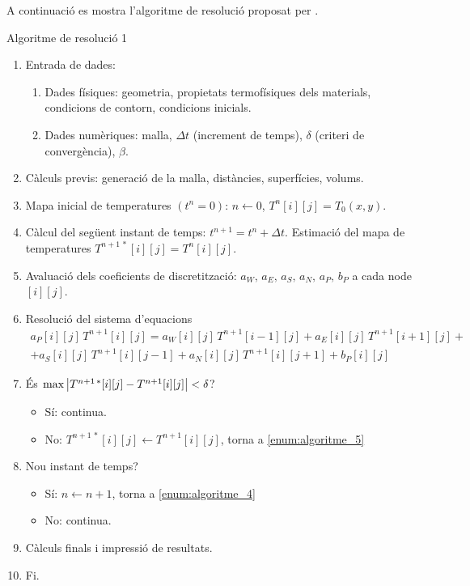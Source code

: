A continuació es mostra l'algoritme de resolució proposat per \cite{cttc}.
\begin{algorithm}[h]
	\caption{Algoritme de resolució 1}
	\label{algorithm:algoritme_resolucio_1}
	\begin{algorithmic}[0]
		\State 
		\begin{enumerate}[label=\textbf{\arabic*}]
			\item Entrada de dades:
			\begin{enumerate}[label=\textbf{1.\arabic*}]
				\item Dades físiques: geometria, propietats termofísiques dels materials, condicions de contorn, condicions inicials.
				\item Dades numèriques: malla, $\Delta t$ (increment de temps), $\delta$ (criteri de convergència), $\beta$.
			\end{enumerate}
			\item Càlculs previs: generació de la malla, distàncies, superfícies, volums.
			\item Mapa inicial de temperatures $(t^n = 0)$: $n \gets 0$, $T^n[i][j] = T_0(x,y)$.
			\item Càlcul del següent instant de temps: $t^{n+1} = t^n + \Delta t$. Estimació del mapa de temperatures $T^{n+1 \, \ast}[i][j] = T^n[i][j]$. \label{enum:algoritme_4}
			\item Avaluació dels coeficients de discretització: $a_W, \, a_E, \, a_S, \, a_N, \, a_P, \, b_P$ a cada node $[i][j]$. \label{enum:algoritme_5}
			\item Resolució del sistema d'equacions \label{enum:algoritme_6}
			\vspace*{-3mm}
			\begin{multline*}
				a_P[i][j] \, T^{n+1}[i][j] =  
				a_W[i][j] \, T^{n+1}[i-1][j] + 
				a_E[i][j] \, T^{n+1}[i+1][j] + \\ +
				a_S[i][j] \, T^{n+1}[i][j-1] + 
				a_N[i][j] \, T^{n+1}[i][j+1] + 
				b_P[i][j]
			\end{multline*}
			\item És $\max{\abs{T^{n+1 \, \ast}[i][j] - T^{n+1}[i][j]}} < \delta$? \label{enum:algoritme_7}
			\begin{itemize}
				\item Sí: continua.
				\item No: $T^{n+1 \, \ast}[i][j] \gets T^{n+1}[i][j]$, torna a \ref{enum:algoritme_5}
			\end{itemize}
			\item Nou instant de temps?
			\begin{itemize}
				\item Sí: $n \gets n + 1$, torna a \ref{enum:algoritme_4}
				\item No: continua.
			\end{itemize}
			\item Càlculs finals i impressió de resultats.
			\item Fi.
		\end{enumerate}
	\end{algorithmic}
\end{algorithm}

